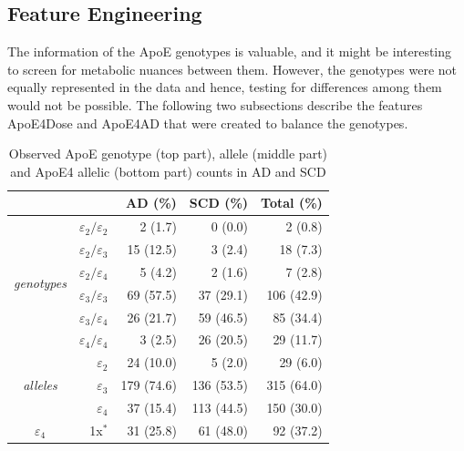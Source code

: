 \documentclass{amsart}
\begin{document}
\subsection{Feature Engineering}\label{featureeng}
The information of the ApoE genotypes is valuable, and it might be interesting to screen for metabolic nuances between them. However, the genotypes were not equally represented in the data and hence, testing for differences among them would not be possible. The following two subsections describe the features ApoE4Dose and ApoE4AD that were created to balance the genotypes.

\begin{table}
  \caption{Observed ApoE genotype (top part), allele (middle part) and ApoE4 allelic (bottom part) counts in AD and SCD}
\begin{threeparttable}
\centering 
\label{tab:ApoEfreq}
  \begin{tabular}{crrrr} \toprule
    \multicolumn{1}{l}{}                & \multicolumn{1}{l}{}               & AD (\%)    & SCD (\%)   & Total (\%)  \\ \midrule
    \multirow{6}{*}{\textit{genotypes}} & $\varepsilon_2/\varepsilon_2$        & 2 (1.7)    & 0 (0.0)    & 2 (0.8)     \\
                                        & $\varepsilon_2/\varepsilon_3$      & 15 (12.5)  & 3 (2.4)    & 18 (7.3)    \\
                                        & $\varepsilon_2/\varepsilon_4$      & 5 (4.2)    & 2 (1.6)    & 7 (2.8)     \\
                                        & $\varepsilon_3/\varepsilon_3$      & 69 (57.5)  & 37 (29.1)  & 106 (42.9)  \\
                                        & $\varepsilon_3/\varepsilon_4$      & 26 (21.7)  & 59 (46.5)  & 85 (34.4)   \\
                                        & $\varepsilon_4/\varepsilon_4$      & 3 (2.5)    & 26 (20.5)  & 29 (11.7)   \\ \midrule
   \multirow{3}{*}{\textit{alleles}}    & $\varepsilon_2$    & 24 (10.0)  & 5 (2.0)    & 29 (6.0)    \\
                                        & $\varepsilon_3$    & 179 (74.6) & 136 (53.5) & 315 (64.0)    \\
                                        & $\varepsilon_4$   & 37 (15.4)  & 113 (44.5) & 150 (30.0)    \\ \midrule
    \multirow{4}{*}{$\varepsilon_4$}   & 1x$^\ast$            & 31 (25.8)  & 61 (48.0)  & 92 (37.2)   \\

\end{tabular}
\end{threeparttable}
\end{table}
\end{document}
